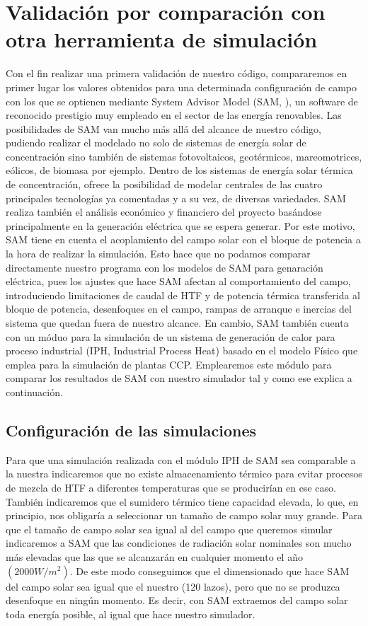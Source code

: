 \section{Validación por comparación con otra herramienta de simulación}

Con el fin realizar una primera validación de nuestro código, compararemos en primer lugar los valores obtenidos para una determinada configuración de campo con los que se optienen mediante System Advisor Model (SAM, \cite{freemanSystemAdvisorModel2018}), un software de reconocido prestigio muy empleado en el sector de las energía renovables. Las posibilidades de SAM van mucho más allá del alcance de nuestro código, pudiendo realizar el modelado no solo de sistemas de energía solar de concentración sino también de sistemas fotovoltaicos, geotérmicos, mareomotrices, eólicos, de biomasa por ejemplo. Dentro de los sistemas de energía solar térmica de concentración, ofrece la posibilidad de modelar centrales de las cuatro principales tecnologías ya comentadas y a su vez, de diversas variedades. SAM realiza también el análisis económico y financiero del proyecto basándose principalmente en la generación eléctrica que se espera generar. Por este motivo, SAM tiene en cuenta el acoplamiento del campo solar con el bloque de potencia a la hora de realizar la simulación.  Esto hace que no podamos comparar directamente nuestro programa con los modelos de SAM para genaración eléctrica, pues los ajustes que hace SAM afectan al comportamiento del campo, introduciendo limitaciones de caudal de HTF y de potencia térmica transferida al bloque de potencia, desenfoques en el campo, rampas de arranque e inercias del sistema que quedan fuera de nuestro alcance. En cambio, SAM también cuenta con un móduo para la simulación de un sistema de generación de calor  para proceso industrial (IPH, Industrial Process Heat) basado en el modelo Físico que emplea para la simulación de plantas CCP. Emplearemos este módulo para comparar los resultados de SAM con nuestro simulador tal y como ese explica a continuación.

\subsection{Configuración de las simulaciones}
\label{configuracion-simulaciones}

Para que una simulación realizada con el módulo IPH de SAM sea comparable a la nuestra indicaremos que no existe almacenamiento térmico para evitar procesos de mezcla de HTF a diferentes temperaturas que se producirían en ese caso. También indicaremos que el sumidero térmico tiene capacidad elevada, lo que, en principio, nos obligaría a seleccionar un tamaño de campo solar muy grande. Para que el tamaño de campo solar sea igual al del campo que queremos simular indicaremos a SAM que las condiciones de radiación solar nominales son mucho más elevadas que las que se alcanzarán en cualquier momento el año $(2000 W/m^2)$. De este modo conseguimos que el dimensionado que hace SAM del campo solar sea igual que el nuestro (120 lazos), pero que no se produzca desenfoque en ningún momento. Es decir, con SAM extraemos del campo solar toda energía posible, al igual que hace nuestro simulador.

